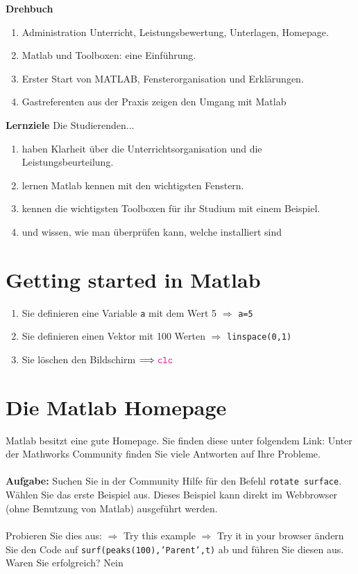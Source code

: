 \textbf{Drehbuch}
\begin{enumerate}[$\bullet$]
\item Administration Unterricht, Leistungsbewertung, Unterlagen, Homepage.
\item Matlab und Toolboxen: eine Einführung.
\item Erster Start von MATLAB, Fensterorganisation und Erklärungen.
\item Gastreferenten aus der Praxis zeigen den Umgang mit Matlab
\end{enumerate}
\textbf{Lernziele}
Die Studierenden...
\begin{enumerate}[$\bullet$]
\item haben Klarheit über die Unterrichtsorganisation und die Leistungsbeurteilung.
\item lernen Matlab kennen mit den wichtigsten Fenstern.
\item kennen die wichtigsten Toolboxen für ihr Studium mit einem Beispiel.
\item und wissen, wie man überprüfen kann, welche installiert sind
\end{enumerate}
\section{Getting started in Matlab}
\begin{enumerate}
\item Sie definieren eine Variable \texttt{a} mit dem Wert 5 $\Longrightarrow$ {\color{magenta}\texttt{a=5}}
\item Sie definieren einen Vektor mit 100 Werten $\Longrightarrow$ {\color{magenta}\texttt{linspace(0,1)}}
\item Sie löschen den Bildschirm $\Longrightarrow {\color{magenta}\texttt{clc}}$
\end{enumerate}
\section{Die Matlab Homepage}
Matlab besitzt eine gute Homepage. Sie finden diese unter folgendem Link:
Unter der Mathworks Community finden Sie viele Antworten auf Ihre Probleme.
\\\\
\textbf{Aufgabe:}
Suchen Sie in der Community Hilfe für den Befehl {\color{red}\texttt{rotate surface}}.
Wählen Sie das erste Beispiel aus.
Dieses Beispiel kann direkt im Webbrowser (ohne Benutzung von Matlab) ausgeführt werden.
\\\\
Probieren Sie dies aus:
$\Rightarrow$ Try this example $\Rightarrow$ Try it in your browser
ändern Sie den Code auf 
{\color{red}\texttt{surf(peaks(100),'Parent',t)}}
ab und führen Sie diesen aus.
Waren Sie erfolgreich? Nein
